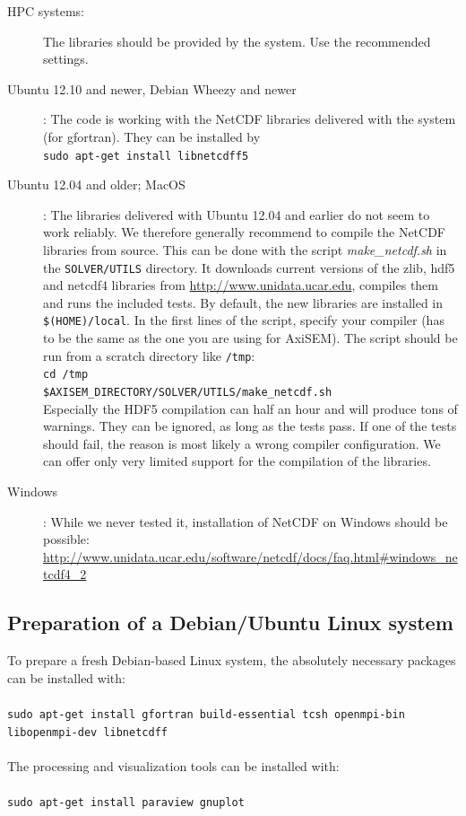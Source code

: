 \documentclass{article}
\begin{document}
\begin{description}
    \item[HPC systems:] The libraries should be provided by the system. Use the
          recommended settings.
    \item[Ubuntu 12.10 and newer, Debian Wheezy and newer]: The code is working with the NetCDF libraries delivered
          with the system (for gfortran). They can be installed by \\
          \verb|sudo apt-get install libnetcdff5|
    \item[Ubuntu 12.04 and older; MacOS]: The libraries delivered with Ubuntu 12.04 and
          earlier do not seem to work reliably. We therefore generally recommend to
          compile the NetCDF libraries from source. This can be done with the script
          \textit{make\_netcdf.sh} in the \verb|SOLVER/UTILS| directory. It downloads
          current versions of the zlib, hdf5 and netcdf4 libraries from
          \url{http://www.unidata.ucar.edu}, compiles them and runs the included tests. By
          default, the new libraries are installed in \verb|$(HOME)/local|. In the first
          lines of the script, specify your compiler (has to be the same as the one you
          are using for AxiSEM). The script should be run from a scratch directory like
          \verb|/tmp|:\\
          \verb|cd /tmp|\\
          \verb|$AXISEM_DIRECTORY/SOLVER/UTILS/make_netcdf.sh|\\
          Especially the HDF5 compilation can half an hour and will produce tons of warnings. They can be
          ignored, as long as the tests pass. If one of the tests should fail, the reason
          is most likely a wrong compiler configuration. We can offer only very limited
          support for the compilation of the libraries.
    \item[Windows]: While we never tested it, installation of NetCDF on Windows should be
          possible: \url{http://www.unidata.ucar.edu/software/netcdf/docs/faq.html#windows_netcdf4_2}
\end{description}


\subsection{Preparation of a Debian/Ubuntu Linux system}
To prepare a fresh Debian-based Linux system, the absolutely necessary packages can be installed with:\\ \\
 \verb|sudo apt-get install gfortran build-essential tcsh openmpi-bin libopenmpi-dev libnetcdff|\\ \\
The processing and visualization tools can be installed with:\\ \\
 \verb|sudo apt-get install paraview gnuplot|
\end{document}
